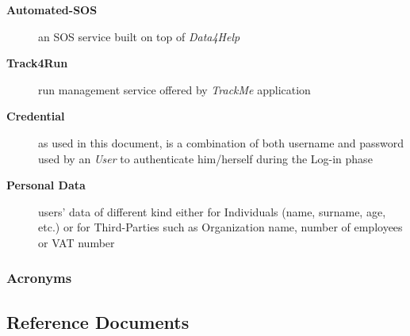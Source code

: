 \documentclass[a4paper]{article}
\begin{document}
\begin{description}
                    \item[\textbf{Automated-SOS}] an SOS service built on top of \textit{Data4Help}
                    
                    \item[\textbf{Track4Run}] run management service offered by \textit{TrackMe} application
                    
                    \item[\textbf{Credential}] as used in this document, is a combination of both username and password used by an \textit{User} to authenticate him/herself during the Log-in phase
                    
                    \item[\textbf{Personal Data}] users' data of different kind either for Individuals (name, surname, age, etc.) or for Third-Parties such as Organization name, number of employees or VAT number
                \end{description}
            
            \subsubsection{Acronyms}
            \begin{acronym}
            \end{acronym}
            
\subsection{Reference Documents}
\printbibliography[heading=none]

\end{document}
